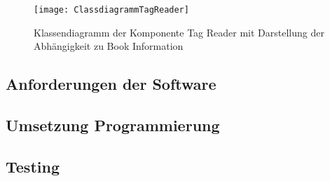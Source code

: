 \begin{figure}[htb]
	\centering
	\texttt{[image: ClassdiagrammTagReader]}
	\caption{Klassendiagramm der Komponente Tag Reader mit Darstellung der Abhängigkeit zu Book Information}
	\label{fig:ClassTagReader}
\end{figure}

\clearpage

\subsection{Anforderungen der Software}

\subsection{Umsetzung Programmierung}

\subsection{Testing}
